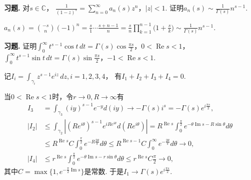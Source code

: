 \textbf{习题. } 对$s\in\mathbb{C}$，
$\displaystyle{\frac{1}{(1-z)^s}=\sum\limits_{n=0}^\infty a_n(s)z^n}$，$|z|<1$.
证明$\displaystyle{a_n(s)\sim\frac{1}{\Gamma(s)}n^{s-1}}$.

\begin{proofc}
    $\displaystyle{a_n(s)=\binom{-s}{n}(-1)^n
    =\frac{s}{1}\cdots\frac{s+n-1}{n}
    =\frac{s}{n}\prod\limits_{k=1}^{n-1}\Big(1+\frac{s}{k}\Big)
    \sim\frac{1}{\Gamma(s)}n^{s-1}}$.
\end{proofc}

\textbf{习题. } 证明$\displaystyle{\int_0^\infty t^{s-1}\cos t\,dt
=\Gamma(s)\cos\frac{\pi s}{2}}$，$0<\operatorname{Re}s<1$，
$\displaystyle{\int_0^\infty t^{s-1}\sin t\,dt
=\Gamma(s)\sin\frac{\pi s}{2}}$，$-1<\operatorname{Re}s<1$.

\begin{proofc}
    记$\displaystyle{I_i=\int_{\gamma_i}z^{s-1}e^{iz}\,dz,i=1,2,3,4}$，
    有$I_1+I_2+I_3+I_4=0$.

    当$0<\operatorname{Re}s<1$时，令$r\rightarrow0,R\rightarrow\infty$有
    \begin{align*}
    I_3&=\int_{\gamma_3}(iy)^{s-1}e^{-y}d(iy)\rightarrow-\Gamma(s)i^s=-\Gamma(s)e^{i\frac{\pi s}{2}},\\

    |I_2|&\leq\int_{\gamma_2}|(Re^{i\theta})^{s-1}e^{iRe^{i\theta}}d(Re^{i\theta})|
    =R^{\operatorname{Re}s}\int_0^\frac{\pi}{2}e^{-\theta\operatorname{Im}s-R\sin\theta}d\theta\\
    &\leq R^{\operatorname{Re}s}C\int_0^\frac{\pi}{2}e^{-R\frac{2\theta}{\pi}}d\theta
    \leq R^{\operatorname{Re}s-1}C\int_0^\infty e^{-\frac{2\theta}{\pi}}d\theta\rightarrow0,\\

    |I_4|&\leq r^{\operatorname{Re}s}\int_0^\frac{\pi}{2}e^{-\theta\operatorname{Im}s-r\sin\theta}d\theta
    \leq r^{\operatorname{Re}s}C\frac{\pi}{2}\rightarrow0,
    \end{align*}
    其中$C=\max\{1,e^{-\frac{\pi}{2}\operatorname{Im}s}\}$是常数. 
    于是$I_1\rightarrow\Gamma(s)e^{i\frac{\pi s}{2}}$.


\end{proofc}
